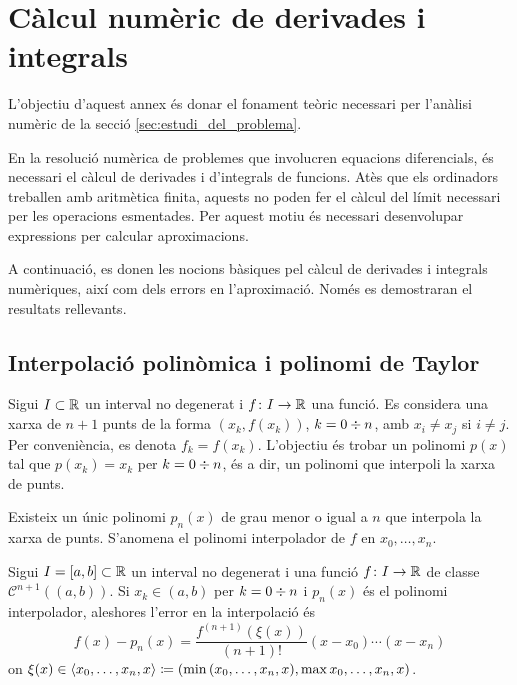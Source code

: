 
\section{Càlcul numèric de derivades i integrals} \label{ap:calcul_numeric}

L'objectiu d'aquest annex és donar el fonament teòric necessari per l'anàlisi numèric de la secció \ref{sec:estudi_del_problema}.

En la resolució numèrica de problemes que involucren equacions diferencials, és necessari el càlcul de derivades i d'integrals de funcions. Atès que els ordinadors treballen amb aritmètica finita, aquests no poden fer el càlcul del límit necessari per les operacions esmentades. Per aquest motiu és necessari desenvolupar expressions per calcular aproximacions.

A continuació, es donen les nocions bàsiques pel càlcul de derivades i integrals numèriques, així com dels errors en l'aproximació. Només es demostraran el resultats rellevants.

\subsection{Interpolació polinòmica i polinomi de Taylor}

Sigui $I \subset \mathbb{R}$ un interval no degenerat i $f \colon I \rightarrow \mathbb{R}$ una funció. Es considera una xarxa de $n+1$ punts de la forma $(x_k, f(x_k))$, $k = 0 \divisionsymbol n$, amb $x_i \neq x_j$ si $i \neq j$. Per conveniència, es denota $f_k = f(x_k)$. L'objectiu és trobar un polinomi $p(x)$ tal que $p(x_k) = x_k$ per $k = 0 \divisionsymbol n$, és a dir, un polinomi que interpoli la xarxa de punts.

\begin{theorem} \label{teo:existencia_unicitat}
	Existeix un únic polinomi $p_n(x)$ de grau menor o igual a $n$ que interpola la xarxa de punts. S'anomena el polinomi interpolador de $f$ en $x_0, \ldots, x_n$.
\end{theorem}

\begin{theorem}
	Sigui $I = [a, b] \subset \mathbb{R}$ un interval no degenerat i una funció $f \colon I \rightarrow \mathbb{R}$ de classe $\mathscr{C}^{n+1}((a,b))$. Si $x_k \in (a,b)$ per $k = 0 \divisionsymbol n$ i $p_n(x)$ és el polinomi interpolador, aleshores l'error en la interpolació és
	\[
		f(x) - p_n(x) = 
		\frac{f^{(n+1)}(\xi(x))}{(n+1)!} (x - x_0) \cdots (x - x_n)
	\]
	on $\xi(x) \in \langle x_0, \ldots, x_n, x \rangle \coloneqq (\min{(x_0, \ldots, x_n, x)}, \max{x_0, \ldots, x_n, x})$.
\end{theorem}

